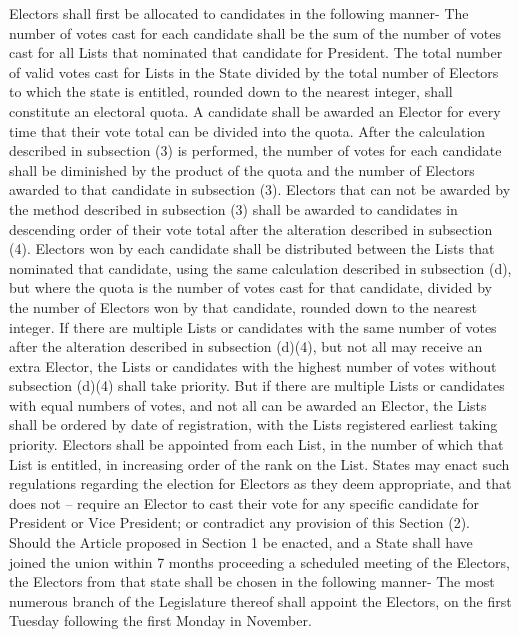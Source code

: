 \documentclass{article}
\begin{document}
    Electors shall first be allocated to candidates in the following manner-
    The number of votes cast for each candidate shall be the sum of the number of votes cast for all Lists that nominated that candidate for President.
    The total number of valid votes cast for Lists in the State divided by the total number of Electors to which the state is entitled, rounded down to the nearest integer, shall constitute an electoral quota.
    A candidate shall be awarded an Elector for every time that their vote total can be divided into the quota.
    After the calculation described in subsection (3) is performed, the number of votes for each candidate shall be diminished by the product of the quota and the number of Electors awarded to that candidate in subsection (3).
    Electors that can not be awarded by the method described in subsection (3) shall be awarded to candidates in descending order of their vote total after the alteration described in subsection (4).
    Electors won by each candidate shall be distributed between the Lists that nominated that candidate, using the same calculation described in subsection (d), but where the quota is the number of votes cast for that candidate, divided by the number of Electors won by that candidate, rounded down to the nearest integer.
    If there are multiple Lists or candidates with the same number of votes after the alteration described in subsection (d)(4), but not all may receive an extra Elector, the Lists or candidates with the highest number of votes without subsection (d)(4) shall take priority. But if there are multiple Lists or candidates with equal numbers of votes, and not all can be awarded an Elector, the Lists shall be ordered by date of registration, with the Lists registered earliest taking priority. 
    Electors shall be appointed from each List, in the number of which that List is entitled, in increasing order of the rank on the List. 
    States may enact such regulations regarding the election for Electors as they deem appropriate, and that does not  –
    require an Elector to cast their vote for any specific candidate for President or Vice President; or
    contradict any provision of this Section (2).
    Should the Article proposed in Section 1 be enacted, and a State shall have joined the union within 7 months proceeding a scheduled meeting of the Electors, the Electors from that state shall be chosen in the following manner-
    The most numerous branch of the Legislature thereof shall appoint the Electors, on the first Tuesday following the first Monday in November. 
\end{document}
